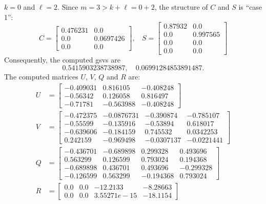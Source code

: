\begin{example}
{\begin{enumerate}[(1).]
$k = 0$ and $\ell = 2$.  Since $m = 3 > k+\ell = 0 + 2$, 
the structure of $C$ and $S$ is ``case 1'':
\begin{equation*}
                C = \begin{bmatrix}
                     0.476231 & 0.0  \\     
                     0.0      & 0.0697426 \\
                     0.0      & 0.0      
                \end{bmatrix}, \ \ \ \
                S = \begin{bmatrix}
                     0.87932 & 0.0    \\  
                     0.0     & 0.997565 \\
                     0.0     & 0.0  \\   
                     0.0     & 0.0   
                \end{bmatrix}
            \end{equation*}
Consequently, the computed gsvs are 
\[ 
0.5415903238738987, \quad 
0.06991284853891487.
\] 
The computed matrices $U$, $V$, $Q$ and $R$ are: 
\begin{align*}
                U &= \begin{bmatrix}
                 -0.409031 &  0.816105 & -0.408248 \\
                 -0.56342  &  0.126058 &  0.816497 \\
                 -0.71781  & -0.563988 & -0.408248
                \end{bmatrix} \\
                V &= \begin{bmatrix}
                 -0.472375 & -0.0876731 & -0.390874  & -0.785107  \\
                 -0.55599  & -0.135916  & -0.53894   &  0.618017  \\
                 -0.639606 & -0.184159  &  0.745532  &  0.0342253 \\
                  0.242159 & -0.969498  & -0.0307137 & -0.0221441
                \end{bmatrix} \\
                Q &= \begin{bmatrix}
                 -0.436701 & -0.689898 &  0.299328  &  0.493696 \\
                  0.563299 &  0.126599 &  0.793024  &  0.194368 \\
                 -0.689898 &  0.436701 &  0.493696  & -0.299328 \\
                 -0.126599 &  0.563299 & -0.194368  &  0.793024
                \end{bmatrix} \\
                R &= \begin{bmatrix}
                 0.0 & 0.0 & -12.2133       & -8.28663 \\
                 0.0 & 0.0 &   3.55271e-15  & -18.1154       
                \end{bmatrix}
            \end{align*}


\end{enumerate}}
\end{example}
